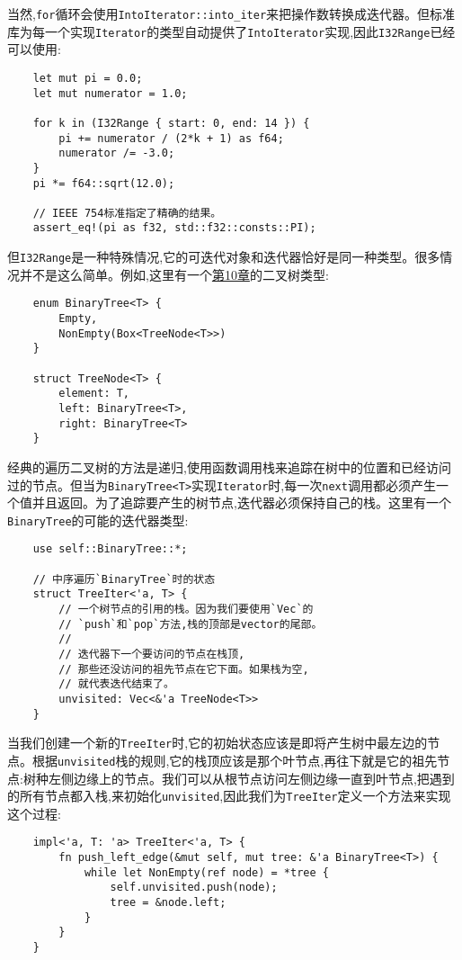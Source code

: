 当然,\texttt{for}循环会使用\texttt{IntoIterator::into\_iter}来把操作数转换成迭代器。但标准库为每一个实现\texttt{Iterator}的类型自动提供了\texttt{IntoIterator}实现,因此\texttt{I32Range}已经可以使用:
\begin{verbatim}
    let mut pi = 0.0;
    let mut numerator = 1.0;

    for k in (I32Range { start: 0, end: 14 }) {
        pi += numerator / (2*k + 1) as f64;
        numerator /= -3.0;
    }
    pi *= f64::sqrt(12.0);

    // IEEE 754标准指定了精确的结果。
    assert_eq!(pi as f32, std::f32::consts::PI);
\end{verbatim}

但\texttt{I32Range}是一种特殊情况,它的可迭代对象和迭代器恰好是同一种类型。很多情况并不是这么简单。例如,这里有一个\hyperref[ch10]{第10章}的二叉树类型:
\begin{verbatim}
    enum BinaryTree<T> {
        Empty,
        NonEmpty(Box<TreeNode<T>>)
    }

    struct TreeNode<T> {
        element: T,
        left: BinaryTree<T>,
        right: BinaryTree<T>
    }
\end{verbatim}

经典的遍历二叉树的方法是递归,使用函数调用栈来追踪在树中的位置和已经访问过的节点。但当为\texttt{BinaryTree<T>}实现\texttt{Iterator}时,每一次\texttt{next}调用都必须产生一个值并且返回。为了追踪要产生的树节点,迭代器必须保持自己的栈。这里有一个\texttt{BinaryTree}的可能的迭代器类型:
\begin{verbatim}
    use self::BinaryTree::*;

    // 中序遍历`BinaryTree`时的状态
    struct TreeIter<'a, T> {
        // 一个树节点的引用的栈。因为我们要使用`Vec`的
        // `push`和`pop`方法,栈的顶部是vector的尾部。
        //
        // 迭代器下一个要访问的节点在栈顶,
        // 那些还没访问的祖先节点在它下面。如果栈为空,
        // 就代表迭代结束了。
        unvisited: Vec<&'a TreeNode<T>>
    }
\end{verbatim}

当我们创建一个新的\texttt{TreeIter}时,它的初始状态应该是即将产生树中最左边的节点。根据\texttt{unvisited}栈的规则,它的栈顶应该是那个叶节点,再往下就是它的祖先节点:树种左侧边缘上的节点。我们可以从根节点访问左侧边缘一直到叶节点,把遇到的所有节点都入栈,来初始化\texttt{unvisited},因此我们为\texttt{TreeIter}定义一个方法来实现这个过程:
\begin{verbatim}
    impl<'a, T: 'a> TreeIter<'a, T> {
        fn push_left_edge(&mut self, mut tree: &'a BinaryTree<T>) {
            while let NonEmpty(ref node) = *tree {
                self.unvisited.push(node);
                tree = &node.left;
            }
        }
    }
\end{verbatim}

